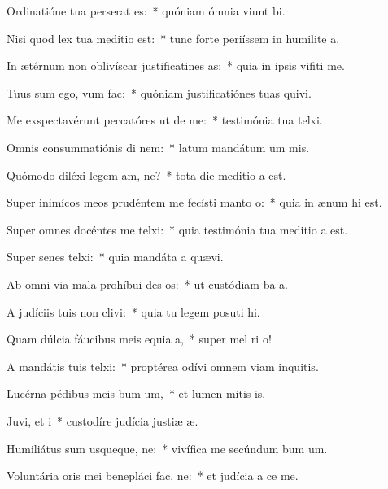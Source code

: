 \item Ordinatióne tua perserat es:~* quóniam ómnia viunt bi.
\item Nisi quod lex tua meditio  est:~* tunc forte periíssem in humilite a.
\item In ætérnum non oblivíscar justificatines as:~* quia in ipsis vifiti me.
\item Tuus sum ego, vum  fac:~* quóniam justificatiónes tuas quivi.
\item Me exspectavérunt peccatóres ut de me:~* testimónia tua telxi.
\item Omnis consummatiónis di nem:~* latum mandátum um mis.
\item Quómodo diléxi legem am, ne?~* tota die meditio a est.
\item Super inimícos meos prudéntem me fecísti manto o:~* quia in ænum hi est.
\item Super omnes docéntes me telxi:~* quia testimónia tua meditio a est.
\item Super senes telxi:~* quia mandáta a quævi.
\item Ab omni via mala prohíbui des os:~* ut custódiam ba a.
\item A judíciis tuis non clivi:~* quia tu legem posuti hi.
\item Quam dúlcia fáucibus meis equia a,~* super mel ri o!
\item A mandátis tuis telxi:~* proptérea odívi omnem viam inquitis.
\item Lucérna pédibus meis bum um,~* et lumen mitis is.
\item Juvi, et i~* custodíre judícia justiæ æ.
\item Humiliátus sum usqueque, ne:~* vivífica me secúndum bum um.
\item Voluntária oris mei benepláci fac, ne:~* et judícia a ce me.
